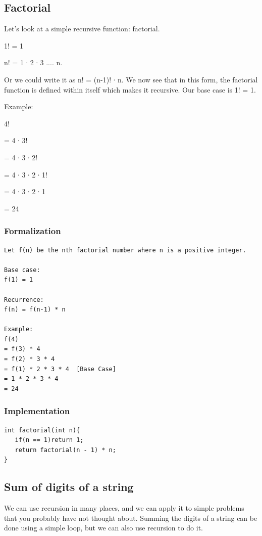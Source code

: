 \documentclass[11pt,oneside]{book}
\begin{document}
\subsection{Factorial}

Let's look at a simple recursive function: factorial.

1! = 1

n! = 1 ∙ 2 ∙ 3 .... n.

Or we could write it as n! = (n-1)! ∙ n. We now see that in this form, the factorial function is defined within itself which makes it recursive. Our base case is 1! = 1.

Example:

4!

= 4 ∙ 3!

= 4 ∙ 3 ∙ 2!

= 4 ∙ 3 ∙ 2 ∙ 1!

= 4 ∙ 3 ∙ 2 ∙ 1

= 24

\subsubsection{Formalization}

\begin{lstlisting}
Let f(n) be the nth factorial number where n is a positive integer.

Base case:
f(1) = 1

Recurrence:
f(n) = f(n-1) * n

Example:
f(4) 
= f(3) * 4
= f(2) * 3 * 4
= f(1) * 2 * 3 * 4  [Base Case]
= 1 * 2 * 3 * 4
= 24
\end{lstlisting}

\subsubsection{Implementation}

\begin{lstlisting}
int factorial(int n){
   if(n == 1)return 1;
   return factorial(n - 1) * n;
}
\end{lstlisting}

\subsection{Sum of digits of a string}

We can use recursion in many places, and we can apply it to simple problems that you probably have not thought about. Summing the digits of a string can be done using a simple loop, but we can also use recursion to do it.
\end{document}
